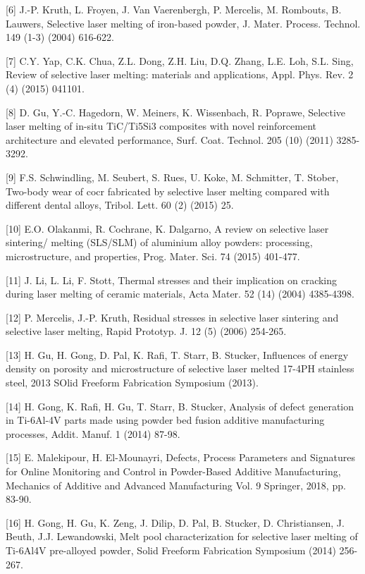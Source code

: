 \documentclass[10pt]{article}
\begin{document}
[6] J.-P. Kruth, L. Froyen, J. Van Vaerenbergh, P. Mercelis, M. Rombouts, B. Lauwers, Selective laser melting of iron-based powder, J. Mater. Process. Technol. 149 (1-3) (2004) 616-622.

[7] C.Y. Yap, C.K. Chua, Z.L. Dong, Z.H. Liu, D.Q. Zhang, L.E. Loh, S.L. Sing, Review of selective laser melting: materials and applications, Appl. Phys. Rev. 2 (4) (2015) 041101.

[8] D. Gu, Y.-C. Hagedorn, W. Meiners, K. Wissenbach, R. Poprawe, Selective laser melting of in-situ TiC/Ti5Si3 composites with novel reinforcement architecture and elevated performance, Surf. Coat. Technol. 205 (10) (2011) 3285-3292.

[9] F.S. Schwindling, M. Seubert, S. Rues, U. Koke, M. Schmitter, T. Stober, Two-body wear of cocr fabricated by selective laser melting compared with different dental alloys, Tribol. Lett. 60 (2) (2015) 25.

[10] E.O. Olakanmi, R. Cochrane, K. Dalgarno, A review on selective laser sintering/ melting (SLS/SLM) of aluminium alloy powders: processing, microstructure, and properties, Prog. Mater. Sci. 74 (2015) 401-477.

[11] J. Li, L. Li, F. Stott, Thermal stresses and their implication on cracking during laser melting of ceramic materials, Acta Mater. 52 (14) (2004) 4385-4398.

[12] P. Mercelis, J.-P. Kruth, Residual stresses in selective laser sintering and selective laser melting, Rapid Prototyp. J. 12 (5) (2006) 254-265.

[13] H. Gu, H. Gong, D. Pal, K. Rafi, T. Starr, B. Stucker, Influences of energy density on porosity and microstructure of selective laser melted 17-4PH stainless steel, 2013 SOlid Freeform Fabrication Symposium (2013).

[14] H. Gong, K. Rafi, H. Gu, T. Starr, B. Stucker, Analysis of defect generation in Ti-6Al-4V parts made using powder bed fusion additive manufacturing processes, Addit. Manuf. 1 (2014) 87-98.

[15] E. Malekipour, H. El-Mounayri, Defects, Process Parameters and Signatures for Online Monitoring and Control in Powder-Based Additive Manufacturing, Mechanics of Additive and Advanced Manufacturing Vol. 9 Springer, 2018, pp. 83-90.

[16] H. Gong, H. Gu, K. Zeng, J. Dilip, D. Pal, B. Stucker, D. Christiansen, J. Beuth, J.J. Lewandowski, Melt pool characterization for selective laser melting of Ti-6Al4V pre-alloyed powder, Solid Freeform Fabrication Symposium (2014) 256-267.
\end{document}
